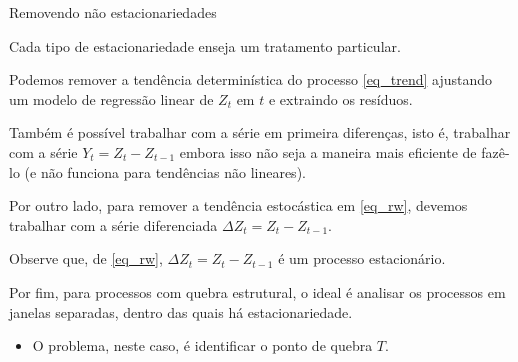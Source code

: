 \documentclass[11pt]{beamer}
\newenvironment{halfwideitemize}{\itemize\addtolength{\itemsep}{0.5em}}{\enditemize}
\begin{document}
\begin{frame}{Removendo não estacionariedades}
	\begin{halfwideitemize}
		\item Cada tipo de estacionariedade enseja um tratamento particular.
		\item Podemos remover a tendência determinística do processo \eqref{eq_trend} ajustando um modelo de regressão linear de $Z_t$ em $t$ e extraindo os resíduos.
		\begin{halfwideitemize}
			\item Também é possível trabalhar com a série em {\color{blue}primeira diferenças}, isto é, trabalhar com a série $Y_t = Z_{t} - Z_{t-1}$ embora isso não seja a maneira mais eficiente de fazê-lo (e não funciona para tendências não lineares).
		\end{halfwideitemize}
		\item Por outro lado, para remover a tendência estocástica em \eqref{eq_rw}, devemos trabalhar com a {\color{blue}série diferenciada} $\Delta Z_t = Z_{t} - Z_{t-1}$.
		\begin{halfwideitemize}
			\item Observe que, de \eqref{eq_rw}, $\Delta Z_t = Z_t-Z_{t-1}$ é um processo estacionário.
		\end{halfwideitemize} 
		\item Por fim, para processos com quebra estrutural, o ideal é analisar os processos em janelas separadas, dentro das quais há estacionariedade.
		\begin{itemize}
			\vspace{-1em}
			\item O problema, neste caso, é identificar o ponto de quebra $T$.
		\end{itemize}
	\end{halfwideitemize}
\end{frame}
\end{document}
